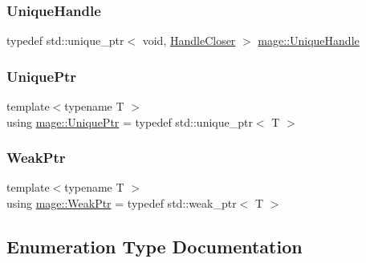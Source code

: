 \hypertarget{namespacemage_a284e84e551a05d4fc6c957985b2de3ed}{}\label{namespacemage_a284e84e551a05d4fc6c957985b2de3ed} 
\subsubsection{\texorpdfstring{Unique\+Handle}{UniqueHandle}}
{\footnotesize\ttfamily typedef std\+::unique\+\_\+ptr$<$ void, \hyperlink{structmage_1_1_handle_closer}{Handle\+Closer} $>$ \hyperlink{namespacemage_a284e84e551a05d4fc6c957985b2de3ed}{mage\+::\+Unique\+Handle}}

\hypertarget{namespacemage_a8c307fbcc33bce9b7f2aa4c26c3b95cf}{}\label{namespacemage_a8c307fbcc33bce9b7f2aa4c26c3b95cf} 
\subsubsection{\texorpdfstring{Unique\+Ptr}{UniquePtr}}
{\footnotesize\ttfamily template$<$typename T $>$ \\
using \hyperlink{namespacemage_a8c307fbcc33bce9b7f2aa4c26c3b95cf}{mage\+::\+Unique\+Ptr} = typedef std\+::unique\+\_\+ptr$<$ T $>$}

\hypertarget{namespacemage_aa159a63c0d58464bdf32dfe419dd5dc1}{}\label{namespacemage_aa159a63c0d58464bdf32dfe419dd5dc1} 
\subsubsection{\texorpdfstring{Weak\+Ptr}{WeakPtr}}
{\footnotesize\ttfamily template$<$typename T $>$ \\
using \hyperlink{namespacemage_aa159a63c0d58464bdf32dfe419dd5dc1}{mage\+::\+Weak\+Ptr} = typedef std\+::weak\+\_\+ptr$<$ T $>$}



\subsection{Enumeration Type Documentation}
\hypertarget{namespacemage_a0c586a2bad862f4858900ca121ca80c2}{}\label{namespacemage_a0c586a2bad862f4858900ca121ca80c2} 
